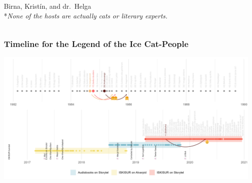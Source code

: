 \begin{frame}
\begin{columns}[T]
\begin{column}{0.45\textwidth}
            \vfill
            Birna, Krist\'{i}n, and dr.~Helga\\
            \vspace{12pt}
            \footnotesize{*\emph{None of the hosts are actually cats or literary experts.}}
        \end{column}
    \end{columns}
\end{frame}

\begin{frame}
    \frametitle{Timeline for the Legend of the Ice Cat-People}
    \includegraphics[width=\textwidth]{../R/figures/timeline}
\end{frame}
